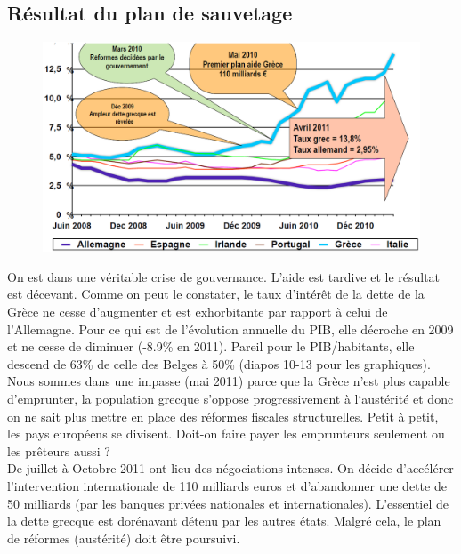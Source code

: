 \subsection{Résultat du plan de sauvetage}
\begin{figure}
	\includegraphics[scale=0.3]{39}
\end{figure}
\noindent On est dans une véritable crise de gouvernance. L'aide est tardive et le résultat est décevant. Comme on peut le constater, le taux d'intérêt de la dette de la Grèce ne cesse d'augmenter et est exhorbitante par rapport à celui de l'Allemagne. Pour ce qui est de l'évolution annuelle du PIB, elle décroche en 2009 et ne cesse de diminuer (-8.9\% en 2011). Pareil pour le PIB/habitants, elle descend de 63\% de celle des Belges à 50\% (diapos 10-13 pour les graphiques).\\
Nous sommes dans une impasse (mai 2011) parce que la Grèce n’est plus capable d’emprunter, la population grecque s'oppose progressivement à l‘austérité et donc on ne sait plus mettre en place des réformes fiscales structurelles. Petit à petit, les pays européens se divisent. Doit-on faire payer les emprunteurs seulement ou les prêteurs aussi ?\\
De juillet à Octobre 2011 ont lieu des négociations intenses. On décide d'accélérer l’intervention internationale de 110 milliards euros et d'abandonner une dette de 50 milliards (par les banques privées nationales et internationales). L’essentiel de la dette grecque est dorénavant détenu par les autres états. Malgré cela, le plan de réformes (austérité) doit être poursuivi.

